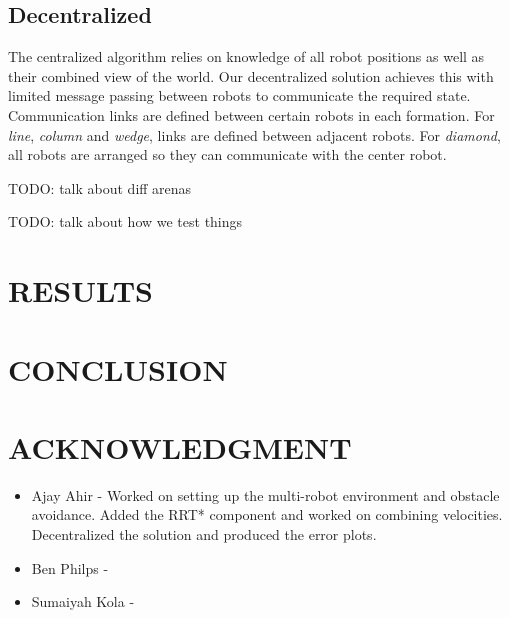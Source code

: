 \documentclass[letterpaper, 10 pt, conference]{ieeeconf}  %
\begin{document}
\subsection{Decentralized}

The centralized algorithm relies on knowledge of all robot positions as well as their combined view of the world. Our decentralized solution achieves this with limited message passing between robots to communicate the required state. Communication links are defined between certain robots in each formation. For \textit{line}, \textit{column} and \textit{wedge}, links are defined between adjacent robots. For \textit{diamond}, all robots are arranged so they can communicate with the center robot.  

TODO: talk about diff arenas

TODO: talk about how we test things

\section{RESULTS}

\section{CONCLUSION}

\addtolength{\textheight}{-12cm}   %

\section{ACKNOWLEDGMENT}

\begin{itemize}
\item Ajay Ahir - Worked on setting up the multi-robot environment and obstacle avoidance. Added the RRT* component and worked on combining velocities. Decentralized the solution and produced the error plots.
\item Ben Philps - 
\item Sumaiyah Kola - 
\end{itemize}
\end{document}
